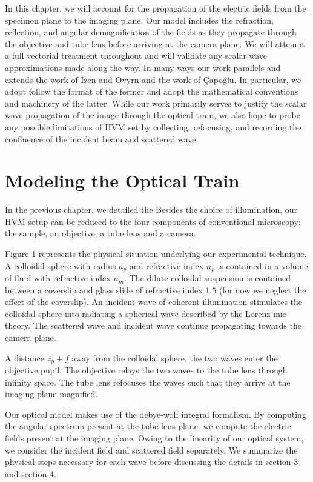 In this chapter, we will account for the propagation of the electric fields from
the specimen plane to the imaging plane. Our model includes the
refraction, reflection, and angular demagnification of the fields as they propagate
through the objective and tube lens before arriving at the camera plane.
We will attempt a full vectorial treatment throughout and will
validate any scalar wave approximations made along the way. In many ways our work
parallels and extends the work of Izen and Ovyrn\cite{izen00} and the work of
\c{C}apo\u{g}lu\cite{capoglu12}. In particular, we adopt follow the format of the
former and adopt the mathematical conventions and machinery of the latter.
While our work primarily serves to justify the scalar wave propagation of the
image through the optical train, we also hope to probe any possible limitations
of HVM set by collecting, refocusing, and recording the confluence of the incident
beam and scattered wave.


\section{Modeling the Optical Train}

In the previous chapter, we detailed the 
Besides the choice of illumination, our HVM setup can be reduced to the four components
of conventional microscopy: the sample, an objective, a tube lens and a camera.

Figure 1 represents the physical situation underlying our experimental technique.
A colloidal sphere with radius $a_p$ and refractive index $n_p$ is contained
in a volume of fluid with refractive index $n_m$. The dilute colloidal suspension
is contained between a coverslip and glass slide of refractive index $1.5$
(for now we neglect the effect of the coverslip). An incident wave of coherent
illumination stimulates the colloidal sphere into radiating a spherical wave
described by the Lorenz-mie theory. The scattered wave and incident wave continue
propagating towards the camera plane.

A distance $z_p + f$ away from the colloidal sphere, the two waves enter the
objective pupil. The objective relays the two waves to the tube lens through
infinity space. The tube lens refocuses the waves such that they arrive at the imaging
plane magnified.

Our optical model makes use of the debye-wolf integral formalism. By computing the
angular spectrum present at the tube lens plane, we compute the electric fields
present at the imaging plane. Owing to the linearity of our optical system,
we consider the incident field and scattered field separately. We summarize the physical
steps necessary for each wave before discussing the details in section 3 and section 4.

